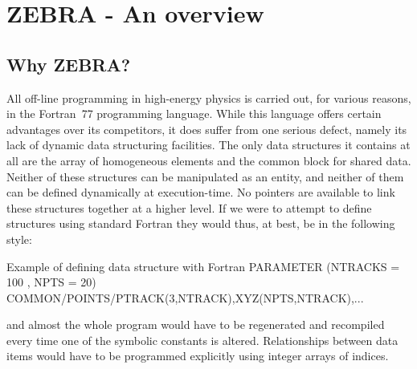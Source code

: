 

\chapter{ZEBRA - An overview}

\section{Why ZEBRA?}

All off-line programming in high-energy physics is carried out, for
various reasons, in the Fortran~77 programming language. While this
language offers certain advantages over its competitors, it does suffer
from one serious defect, namely its lack of dynamic data structuring
facilities. The only data structures it contains at all are the array of
homogeneous elements and the common block for shared data. Neither of
these structures can be manipulated as an entity, and neither of them
can be defined dynamically at execution-time. No pointers are available
to link these structures together at a higher level.
If we were to attempt to
define structures using standard Fortran they would thus, at best, be in
the following style:

\begin{XMPt}{Example of defining data structure with Fortran}
      PARAMETER (NTRACKS = 100 , NPTS = 20)
      COMMON/POINTS/PTRACK(3,NTRACK),XYZ(NPTS,NTRACK),...
\end{XMPt}

and almost the whole program would have to be regenerated and recompiled
every time one of the symbolic constants is altered.
Relationships between data items would have to be programmed explicitly
using integer arrays of indices.
 
